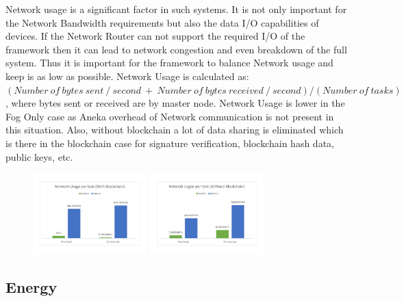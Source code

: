 \documentclass[10pt,journal,compsoc]{IEEEtran}
\begin{document}
Network usage is a significant factor in such systems. It is not only important for the Network Bandwidth requirements but also the data I/O capabilities of devices. If the Network Router can not support the required I/O of the framework then it can lead to network congestion and even breakdown of the full system. Thus it is important for the framework to balance Network usage and keep is as low as possible. Network Usage is calculated as: $(Number\ of\ bytes\ sent\ /\ second\ +\ Number\ of\ bytes\ received\ /\ second)/(Number\ of\ tasks)$, where bytes sent or received are by master node. Network Usage is lower in the Fog Only case as Aneka overhead of Network communication is not present in this situation. Also, without blockchain a lot of data sharing is eliminated which is there in the blockchain case for signature verification, blockchain hash data, public keys, etc.
\begin{figure}[h]
\centering
\includegraphics[width=4.4cm]{g61}    
\includegraphics[width=4.4cm]{g62}
\end{figure}

\subsection{Energy}
\end{document}
